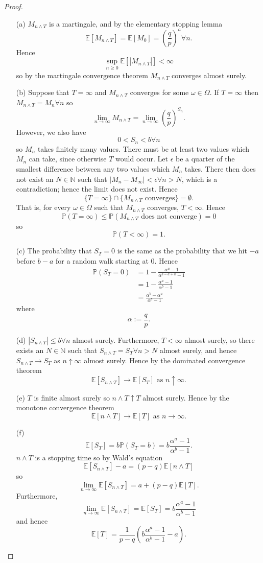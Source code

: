 \documentclass{article}
\begin{document}
\begin{proof}
\begin{enumerate}
\item[(a)] $M_{n\wedge T}$ is a martingale, and by the elementary stopping lemma\[\mathbb{E}[M_{n\wedge T}]=\mathbb{E}[M_0]=\left(\frac{q}{p}\right)^a\forall n.\] Hence \[\sup_{n\geq0}\mathbb{E}[|M_{n\wedge T}|]<\infty\] so by the martingale convergence theorem $M_{n\wedge T}$ converges almost surely.
\item[(b)] Suppose that $T=\infty$ and $M_{n\wedge T}$ converges for some $\omega\in\Omega$. If $T=\infty$ then $M_{n\wedge T}=M_n\forall n$ so \[\lim_{n\to\infty}M_{n\wedge T}=\lim_{n\to\infty}\left(\frac{q}{p}\right)^{S_n}.\] However, we also have\[0<S_n<b\forall n\] so $M_n$ takes finitely many values. There must be at least two values which $M_n$ can take, since otherwise $T$ would occur. Let $\epsilon$ be a quarter of the smallest difference between any two values which $M_n$ takes. There then does not exist an $N\in\mathbb{N}$ such that $|M_n-M_\infty|<\epsilon\forall n>N$, which is a contradiction; hence the limit does not exist. Hence \[\{T=\infty\}\cap\{M_{n\wedge T}\text{ converges}\}=\emptyset.\] That is, for every $\omega\in\Omega$ such that $M_{n\wedge T}$ converges, $T<\infty$. Hence\[\mathbb{P}(T=\infty)\leq\mathbb{P}(M_{n\wedge T}\text{ does not converge})=0\] so\[\mathbb{P}(T<\infty)=1.\]
\item[(c)] The probability that $S_T=0$ is the same as the probability that we hit $-a$ before $b-a$ for a random walk starting at $0$. Hence\begin{align*}
\mathbb{P}(S_T=0)&=1-\frac{\alpha^{a}-1}{\alpha^{b-a+a}-1}\\&=1-\frac{\alpha^a-1}{\alpha^b-1}\\&=\frac{\alpha^b-\alpha^a}{\alpha^b-1}
\end{align*}where \[\alpha:=\frac{q}{p}.\]
\item[(d)] $|S_{n\wedge T}|\leq b\forall n$ almost surely. Furthermore, $T<\infty$ almost surely, so there exists an $N\in\mathbb{N}$ such that $S_{n\wedge T}=S_T\forall n> N$ almost surely, and hence $S_{n\wedge T}\to S_T$ as $n\uparrow\infty$ almost surely. Hence by the dominated convergence theorem \[\mathbb{E}[S_{n\wedge T}]\to\mathbb{E}[S_T]\text{ as }n\uparrow\infty.\]
\item[(e)] $T$ is finite almost surely so $n\wedge T\uparrow T$ almost surely. Hence by the monotone convergence theorem\[\mathbb{E}[n\wedge T]\to\mathbb{E}[T]\text{ as }n\to\infty.\]
\item[(f)] \[\mathbb{E}[S_T]=b\mathbb{P}(S_T=b)=b\frac{\alpha^a-1}{\alpha^b-1}.\]$n\wedge T$ is a stopping time so by Wald's equation\[\mathbb{E}[S_{n\wedge T}]-a=(p-q)\mathbb{E}[n\wedge T]\] so\[\lim_{n\to\infty}\mathbb{E}[S_{n\wedge T}]=a+(p-q)\mathbb{E}[T].\] Furthermore,\[\lim_{n\to\infty}\mathbb{E}[S_{n\wedge T}]=\mathbb{E}[S_T]=b\frac{\alpha^a-1}{\alpha^b-1}\] and hence\[\mathbb{E}[T]=\frac{1}{p-q}\left(b\frac{\alpha^a-1}{\alpha^b-1}-a\right).\]
\end{enumerate}
\end{proof}
\end{document}
